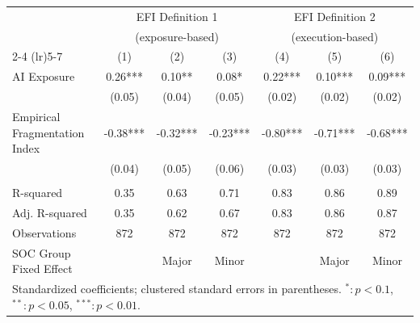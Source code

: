 \setlength{\tabcolsep}{6pt} %
\begin{tabular}{lcccccc}
\toprule
 & \multicolumn{3}{c}{EFI Definition 1} & \multicolumn{3}{c}{EFI Definition 2} \\
 & \multicolumn{3}{c}{(exposure-based)} & \multicolumn{3}{c}{(execution-based)} \\
 \cmidrule(lr){2-4} \cmidrule(lr){5-7}
 & (1) & (2) & (3) & (4) & (5) & (6) \\
\midrule
\addlinespace
AI Exposure & 0.26*** & 0.10** & 0.08* & 0.22*** & 0.10*** & 0.09*** \\
 & (0.05) & (0.04) & (0.05) & (0.02) & (0.02) & (0.02) \\
\addlinespace
Empirical Fragmentation Index & -0.38*** & -0.32*** & -0.23*** & -0.80*** & -0.71*** & -0.68*** \\
 & (0.04) & (0.05) & (0.06) & (0.03) & (0.03) & (0.03) \\
\hline\\[-1.25em]
R-squared & 0.35 & 0.63 & 0.71 & 0.83 & 0.86 & 0.89 \\
Adj. R-squared & 0.35 & 0.62 & 0.67 & 0.83 & 0.86 & 0.87 \\
Observations & 872 & 872 & 872 & 872 & 872 & 872 \\
SOC Group Fixed Effect & & Major & Minor & & Major & Minor \\
\bottomrule
\multicolumn{7}{l}{\footnotesize Standardized coefficients; clustered standard errors in parentheses. $^{*}:p<0.1$, $^{**}:p<0.05$, $^{***}:p<0.01$.} \\
\end{tabular}
